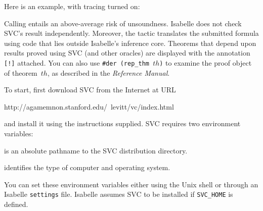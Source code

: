 Here is an example, with tracing turned on:


\begin{warn}
Calling  entails an above-average risk of
unsoundness.  Isabelle does not check SVC's result independently.  Moreover,
the tactic translates the submitted formula using code that lies outside
Isabelle's inference core.  Theorems that depend upon results proved using SVC
(and other oracles) are displayed with the annotation \texttt{[!]} attached.
You can also use \texttt{\#der (rep_thm $th$)} to examine the proof object of
theorem~$th$, as described in the \emph{Reference Manual}.  
\end{warn}

To start, first download SVC from the Internet at URL
\begin{ttbox}
http://agamemnon.stanford.edu/~levitt/vc/index.html
\end{ttbox}
and install it using the instructions supplied.  SVC requires two environment
variables:
\begin{ttdescription}
\item[\ttindexbold{SVC_HOME}] is an absolute pathname to the SVC
    distribution directory. 
    
  \item[\ttindexbold{SVC_MACHINE}] identifies the type of computer and
    operating system.  
\end{ttdescription}
You can set these environment variables either using the Unix shell or through
an Isabelle \texttt{settings} file.  Isabelle assumes SVC to be installed if
\texttt{SVC_HOME} is defined.

